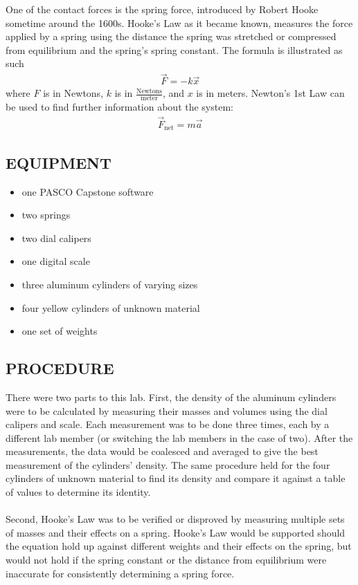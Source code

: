 \documentclass [12pt, letterpaper, twoside] {article}
\begin{document}
One of the contact forces is the spring force, introduced by Robert Hooke sometime around the 1600s. Hooke's Law as it became known, measures the force applied by a spring using the distance the spring was stretched or compressed from equilibrium and the spring's spring constant. The formula is illustrated as such 
\begin {equation}
  \begin {split}
    \vec{F}=-k\vec{x}
  \end {split}
\end {equation}
where \(F\) is in Newtons, \(k\) is in \(\tfrac{\text{Newtons}}{\text{meter}}\), and \(x\) is in meters. Newton's 1st Law can be used to find further information about the system:
\begin {equation}
  \begin {split}
    \vec{F}_{\text{net}}=m\vec{a} 
  \end {split}
\end {equation}

\subsection* {EQUIPMENT}
  \noindent
  \begin {itemize}
    \itemsep0em
    \item {one PASCO Capstone software}
    \item {two springs}
    \item {two dial calipers}
    \item {one digital scale}
    \item {three aluminum cylinders of varying sizes}
    \item {four yellow cylinders of unknown material}
    \item {one set of weights}
  \end {itemize}

\subsection* {PROCEDURE}
There were two parts to this lab. First, the density of the aluminum cylinders were to be calculated by measuring their masses and volumes using the dial calipers and scale. Each measurement was to be done three times, each by a different lab member (or switching the lab members in the case of two). After the measurements, the data would be coalesced and averaged to give the best measurement of the cylinders' density. The same procedure held for the four cylinders of unknown material to find its density and compare it against a table of values to determine its identity.\\\\
Second, Hooke's Law was to be verified or disproved by measuring multiple sets of masses and their effects on a spring. Hooke's Law would be supported should the equation hold up against different weights and their effects on the spring, but would not hold if the spring constant or the distance from equilibrium were inaccurate for consistently determining a spring force.
\end{document}
